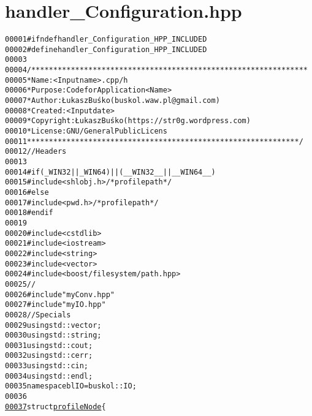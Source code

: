 \hypertarget{handler__Configuration_8hpp_source}{
\section{handler\_\-Configuration.hpp}
}


\begin{footnotesize}\begin{alltt}
00001 \textcolor{preprocessor}{#ifndef handler\_Configuration\_HPP\_INCLUDED}
00002 \textcolor{preprocessor}{}\textcolor{preprocessor}{#define handler\_Configuration\_HPP\_INCLUDED}
00003 \textcolor{preprocessor}{}
00004 \textcolor{comment}{/***************************************************************}
00005 \textcolor{comment}{ * Name:      <Input name>.cpp/h}
00006 \textcolor{comment}{ * Purpose:   Code for Application <Name>}
00007 \textcolor{comment}{ * Author:    Łukasz Buśko (buskol.waw.pl@gmail.com)}
00008 \textcolor{comment}{ * Created:   <Input date>}
00009 \textcolor{comment}{ * Copyright: Łukasz Buśko (https://str0g.wordpress.com)}
00010 \textcolor{comment}{ * License:   GNU / General Public Licens}
00011 \textcolor{comment}{ **************************************************************/}
00012 \textcolor{comment}{//Headers}
00013 
00014 \textcolor{preprocessor}{#if ( \_WIN32 ||  \_WIN64) || ( \_\_WIN32\_\_ || \_\_WIN64\_\_ )}
00015 \textcolor{preprocessor}{}\textcolor{preprocessor}{    #include <shlobj.h>} \textcolor{comment}{/*profile path*/}
00016 \textcolor{preprocessor}{#else}
00017 \textcolor{preprocessor}{}\textcolor{preprocessor}{    #include <pwd.h>} \textcolor{comment}{/*profile path*/}
00018 \textcolor{preprocessor}{#endif}
00019 \textcolor{preprocessor}{}
00020 \textcolor{preprocessor}{#include <cstdlib>}
00021 \textcolor{preprocessor}{#include <iostream>}
00022 \textcolor{preprocessor}{#include <string>}
00023 \textcolor{preprocessor}{#include <vector>}
00024 \textcolor{preprocessor}{#include <boost/filesystem/path.hpp>}
00025 \textcolor{comment}{//}
00026 \textcolor{preprocessor}{#include "myConv.hpp"}
00027 \textcolor{preprocessor}{#include "myIO.hpp"}
00028 \textcolor{comment}{//Specials}
00029 \textcolor{keyword}{using} std::vector;
00030 \textcolor{keyword}{using} std::string;
00031 \textcolor{keyword}{using} std::cout;
00032 \textcolor{keyword}{using} std::cerr;
00033 \textcolor{keyword}{using} std::cin;
00034 \textcolor{keyword}{using} std::endl;
00035 \textcolor{keyword}{namespace }blIO = buskol::IO;
00036 
\hypertarget{handler__Configuration_8hpp_source_l00037}{}\hyperlink{structprofileNode}{00037} \textcolor{keyword}{struct }\hyperlink{structprofileNode}{profileNode}\{

\end{alltt}
\end{footnotesize}
